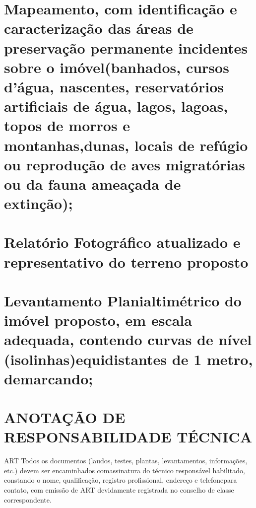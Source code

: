 \chapter{Mapeamento, com identificação e caracterização das áreas de preservação permanente incidentes sobre o imóvel(banhados, cursos d’água, nascentes, reservatórios artificiais de água, lagos, lagoas, topos de morros e montanhas,dunas, locais de refúgio ou reprodução de aves migratórias ou da fauna ameaçada de extinção);}
\chapter{Relatório Fotográfico atualizado e representativo do terreno proposto}
\chapter{Levantamento Planialtimétrico do imóvel proposto, em escala adequada, contendo curvas de nível (isolinhas)equidistantes de 1 metro, demarcando;}
\chapter{ANOTAÇÃO DE RESPONSABILIDADE TÉCNICA}
ART Todos os documentos (laudos, testes, plantas, levantamentos, informações, etc.) devem ser encaminhados comassinatura do técnico responsável habilitado, constando o nome, qualificação, registro profissional, endereço e telefonepara contato, com emissão de ART devidamente registrada no conselho de classe correspondente.
